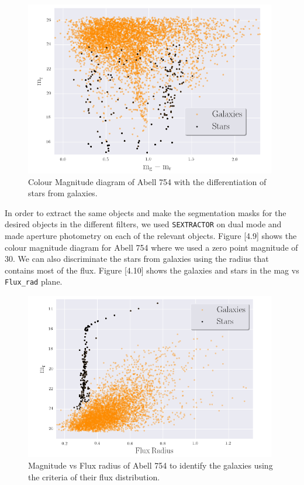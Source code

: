 \begin{figure}[H]
\centering
\includegraphics[width=11cm]{images/color_mag.png}
\caption[Colour Magnitude diagram of Abell 754]{Colour Magnitude diagram of Abell 754 with the differentiation of stars from galaxies.}
\end{figure}

In order to extract the same objects and make the segmentation masks for the desired objects in the different filters, we used \texttt{SEXTRACTOR} on dual mode and made aperture photometry on each of the relevant objects. Figure [4.9] shows the colour magnitude diagram for Abell 754 where we used a zero point magnitude of 30. We can also discriminate the stars from galaxies using the radius that contains most of the flux. Figure [4.10] shows the galaxies and stars in the mag vs \texttt{Flux\_rad} plane.

\begin{figure}[H]
\centering
\includegraphics[width=11cm]{images/mag_vs_flux_rad.png}
\caption[Magnitude vs Flux radius of Abell 754]{Magnitude vs Flux radius of Abell 754 to identify the galaxies using the criteria of their flux distribution.}
\end{figure}


